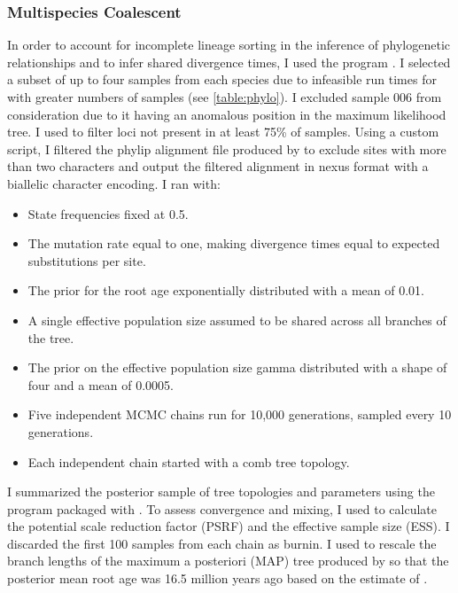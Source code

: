 \subsubsection{Multispecies Coalescent}
In order to account for incomplete lineage sorting in the inference of phylogenetic
relationships and to infer shared divergence times, I used the program \phycoeval \parencite{oaks2022}.
I selected a subset of up to four samples from each species due to
infeasible run times for \phycoeval with greater numbers of samples (see \cref{table:phylo}).
I excluded sample 006 from consideration due to it having an anomalous   
position in the maximum likelihood tree.
I used \pyrad to filter loci not present in at least 75\% of samples. 
Using a custom script, I filtered the phylip alignment file produced by \pyrad 
to exclude sites with more than two characters and output the filtered alignment 
in nexus format with a biallelic character encoding. 
I ran \phycoeval with:
\begin{itemize}
  \item State frequencies fixed at 0.5.
  \item The mutation rate equal to one, making divergence times equal to expected
  substitutions per site.
  \item The prior for the root age exponentially distributed with a mean of 0.01.
  \item A single effective population size assumed to be shared across all branches of the tree.
  \item The prior on the effective population size gamma distributed with a shape 
  of four and a mean of 0.0005.
  \item Five independent MCMC chains run for 10,000 generations, sampled every 10 generations.
  \item Each independent chain started with a comb tree topology.
\end{itemize}
I summarized the posterior sample of tree topologies and parameters using the 
\sumphycoeval program packaged with \phycoeval \parencite{oaks2022}.
To assess convergence and mixing, I used \sumphycoeval to calculate the
potential scale reduction factor (PSRF) and the effective sample size (ESS).
I discarded the first 100 samples from each chain as burnin.
I used \sumphycoeval to rescale the branch lengths of the maximum a posteriori 
(MAP) tree produced by \sumphycoeval so that the posterior mean root age was 
16.5 million years ago based on the estimate of \textcite{feng2017}.

